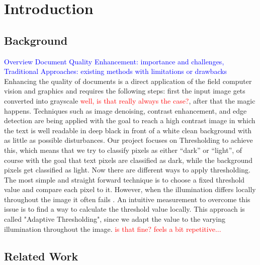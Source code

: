 \documentclass[sigconf]{acmart}
\begin{document}
\let\thefootnote\relax{}



\section{Introduction}

\subsection{Background}

\textcolor{blue}{Overview Document Quality Enhancement: importance and challenges, Traditional Approaches: existing methods with limitations or drawbacks}\\

Enhancing the quality of documents is a direct application of the field computer vision and graphics and requires the following steps: first the input image gets converted into grayscale \textcolor{red}{well, is that really always the case?}, after that the magic happens. Techniques such as image denoising, contrast enhancement, and edge detection are being applied with the goal to reach a high contrast image in which the text is well readable in deep black in front of a white clean background with as little as possible disturbances. Our project focuses on Thresholding to achieve this, which means that we try to classify pixels as either “dark” or “light”, of course with the goal that text pixels are classified as dark, while the background pixels get classified as light. Now there are different ways to apply thresholding. The most simple and straight forward technique is to choose a fixed threshold value and compare each pixel to it. However, when the illumination differs locally throughout the image it often fails \cite{LecSource2}. An intuitive measurement to overcome this issue is to find a way to calculate the threshold value locally. This approach is called "Adaptive Thresholding", since we adapt the value to the varying illumination throughout the image. \textcolor{red}{is that fine? feels a bit repetitive...}

\subsection{Related Work}
\end{document}
